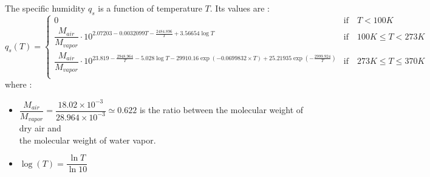 The specific humidity  $q_s$ is a function of temperature $T$. Its values are : 
\begin{equation}
q_s(T) = 
\begin{cases}
0 & \text{if} \quad T < 100K \\
\dfrac{M_{air}}{M_{vapor}} \cdot 10^{2.07203 - 0.0032099T - \frac{2484.896}{T} + 3.56654\log{T}} & \text{if} \quad 100K \leq T < 273K \\
\dfrac{M_{air}}{M_{vapor}} \cdot 10^{23.819 - \frac{2948.964}{T} -
  5.028\log{T} - 29910.16\exp(-0.0699832\times T) + 25.21935\exp(-\frac{2999.924}{T}) } & \text{if} \quad 273K \leq T \leq 370K \\
\end{cases} %
\end{equation}
where : \\
\begin{itemize}
 \item  $\dfrac{M_{air}}{M_{vapor}} = \dfrac{18.02 \times 10^{-3}}{28.964 \times 10^{-3}} \simeq 0.622 $ is the ratio between the molecular weight of dry air and \\ 
the molecular weight of water vapor.
 \item  $\log(T) = \dfrac{\ln T}{\ln 10}$
\end{itemize}

